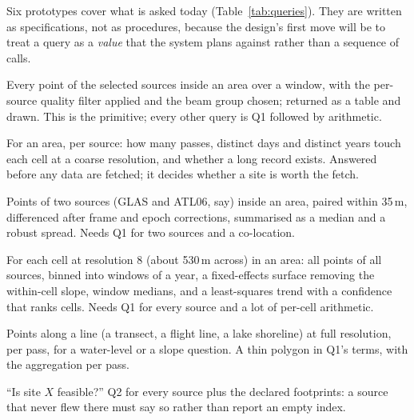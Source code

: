 \documentclass[10pt,a4paper]{article}
\begin{document}
Six prototypes cover what is asked today (Table~\ref{tab:queries}). They are written as specifications, not as
procedures, because the design's first move will be to treat a query as a \emph{value} that the system plans
against rather than a sequence of calls.

\begin{description}\setlength{\itemsep}{2pt}
\item[Q1 Points.] Every point of the selected sources inside an area over a window, with the per-source quality
  filter applied and the beam group chosen; returned as a table and drawn. This is the primitive; every other
  query is Q1 followed by arithmetic.
\item[Q2 Coverage.] For an area, per source: how many passes, distinct days and distinct years touch each cell at a
  coarse resolution, and whether a long record exists. Answered before any data are fetched; it decides whether a
  site is worth the fetch.
\item[Q3 Elevation change between epochs.] Points of two sources (GLAS and ATL06, say) inside an area, paired within
  35\,m, differenced after frame and epoch corrections, summarised as a median and a robust spread. Needs Q1 for two
  sources and a co-location.
\item[Q4 Per-cell time series.] For each cell at resolution 8 (about 530\,m across) in an area: all points of all
  sources, binned into windows of a year, a fixed-effects surface removing the within-cell slope, window medians,
  and a least-squares trend with a confidence that ranks cells. Needs Q1 for every source and a lot of per-cell
  arithmetic.
\item[Q5 Profile.] Points along a line (a transect, a flight line, a lake shoreline) at full resolution, per pass,
  for a water-level or a slope question. A thin polygon in Q1's terms, with the aggregation per pass.
\item[Q6 Triage.] ``Is site $X$ feasible?'' Q2 for every source plus the declared footprints: a source that never
  flew there must say so rather than report an empty index.
\end{description}
\end{document}
